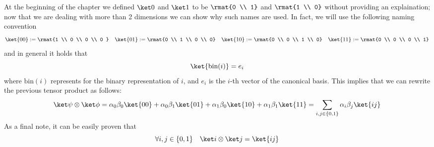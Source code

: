 \documentclass[a4paper, 12pt]{report}
\begin{document}
At the beginning of the chapter we defined $\ket 0$ and $\ket 1$ to be $\rmat{0 \\ 1}$ and $\rmat{1 \\ 0}$ without providing an explaination; now that we are dealing with more than 2 dimensions we can show why such names are used. In fact, we will use the following naming convention $$\ket{00} := \rmat{1 \\ 0 \\ 0 \\ 0 } \quad \ket {01} := \rmat{0 \\ 1 \\ 0 \\ 0} \quad \ket{10} := \rmat{0 \\ 0 \\ 1 \\ 0} \quad \ket{11} := \rmat{0 \\ 0 \\ 0 \\ 1}$$ and in general it holds that $$\ket{\mbox{bin}(i)} = e_i$$ where $\mbox{bin}(i)$ represents for the binary representation of $i$, and $e_i$ is the $i$-th vector of the canonical basis. This implies that we can rewrite the previous tensor product as follows: $$\ket \psi \otimes \ket \phi = \alpha_0 \beta_0 \ket{00} + \alpha_0 \beta_1 \ket{01} + \alpha_1 \beta_0 \ket{10} + \alpha_1 \beta_1 \ket {11} = \sum_{i, j \in \{0, 1\}}{\alpha_i \beta_j \ket{ij}}$$ As a final note, it can be easily proven that $$\forall i, j \in \{0, 1\} \quad \ket i \otimes \ket j = \ket{ij}$$
\end{document}

